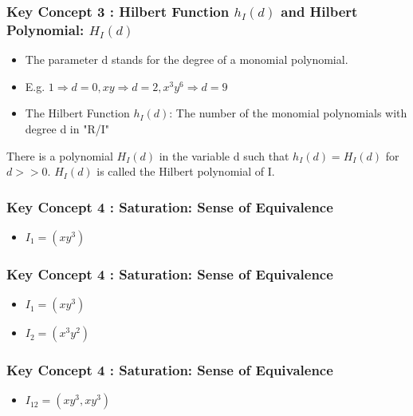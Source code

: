 \documentclass{beamer}
\begin{document}
\begin{frame}
\frametitle{Key Concept 3 : Hilbert Function \(h_I(d)\) and Hilbert Polynomial: \(H_I(d)\)}
\begin{itemize}
	\item The parameter d stands for the degree of a monomial polynomial.
	\item E.g. \(1 \Rightarrow d = 0, xy \Rightarrow d = 2, x^3y^6 \Rightarrow d = 9\)
	\item The Hilbert Function \(h_I(d)\): The number of the monomial polynomials with degree d in "R/I"
\end{itemize}
\begin{theorem}
	There is a polynomial \(H_I(d)\) in the variable d such that \(h_I(d) = H_I(d)\) for \(d >> 0\). \(H_I(d)\) is called the Hilbert polynomial of I.
\end{theorem}
\end{frame}

\begin{frame}
\frametitle{Key Concept 4 : Saturation: Sense of Equivalence}
\begin{center}
	
\end{center}
\begin{itemize}
	\item \(I_1 = (xy^3)\)
\end{itemize}
	
\end{frame}

\begin{frame}
\frametitle{Key Concept 4 : Saturation: Sense of Equivalence}
\begin{center}
	
\end{center}
\begin{itemize}
	\item \(I_1 = (xy^3)\)
	\item \(I_2 = (x^3y^2)\)
\end{itemize}
	
\end{frame}

\begin{frame}
\frametitle{Key Concept 4 : Saturation: Sense of Equivalence}
\begin{center}
	
\end{center}
\begin{itemize}
	\item \(I_12 = (xy^3, xy^3)\)
\end{itemize}
	
\end{frame}
\end{document}

